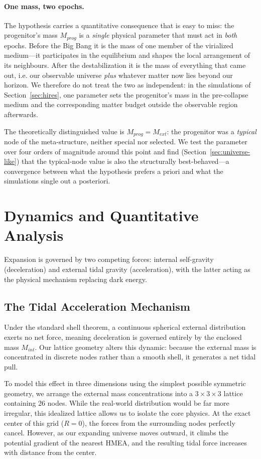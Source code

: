 \documentclass{article}
\begin{document}
\paragraph{One mass, two epochs.} The hypothesis carries a quantitative consequence that is easy to miss: the progenitor's mass $M_{prog}$ is a \emph{single} physical parameter that must act in \emph{both} epochs. Before the Big Bang it is the mass of one member of the virialized medium---it participates in the equilibrium and shapes the local arrangement of its neighbours. After the destabilization it is the mass of everything that came out, i.e. our observable universe \emph{plus} whatever matter now lies beyond our horizon. We therefore do not treat the two as independent: in the simulations of Section~\ref{sec:hires}, one parameter sets the progenitor's mass in the pre-collapse medium and the corresponding matter budget outside the observable region afterwards.

The theoretically distinguished value is $M_{prog} = M_{ext}$: the progenitor was a \emph{typical} node of the meta-structure, neither special nor selected. We test the parameter over four orders of magnitude around this point and find (Section~\ref{sec:universe-like}) that the typical-node value is also the structurally best-behaved---a convergence between what the hypothesis prefers a priori and what the simulations single out a posteriori.

\section{Dynamics and Quantitative Analysis}
\label{sec:dynamics}
Expansion is governed by two competing forces: internal self-gravity (deceleration) and external tidal gravity (acceleration), with the latter acting as the physical mechanism replacing dark energy.

\subsection{The Tidal Acceleration Mechanism}
\label{sec:tidal}
Under the standard shell theorem, a continuous spherical external distribution exerts no net force, meaning deceleration is governed entirely by the enclosed mass $M_{int}$. Our lattice geometry alters this dynamic: because the external mass is concentrated in discrete nodes rather than a smooth shell, it generates a net tidal pull.

To model this effect in three dimensions using the simplest possible symmetric geometry, we arrange the external mass concentrations into a $3\times3\times3$ lattice containing 26 nodes. While the real-world distribution would be far more irregular, this idealized lattice allows us to isolate the core physics. At the exact center of this grid ($R=0$), the forces from the surrounding nodes perfectly cancel. However, as our expanding universe moves outward, it climbs the potential gradient of the nearest HMEA, and the resulting tidal force increases with distance from the center.
\end{document}
